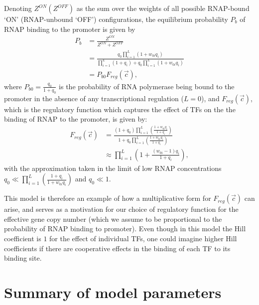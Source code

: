 \documentclass[10pt]{article}
\begin{document}
Denoting $Z^{ON} (Z^{OFF})$ as the sum over the weights of all possible RNAP-bound `ON' (RNAP-unbound `OFF') configurations, the equilibrium probability $P_b$ of RNAP binding to the promoter is given by
\begin{equation}
\begin{split}
    P_b &= \frac{Z^{ON}}{Z^{ON}+Z^{OFF}} \\
    &= \frac{q_0 \prod_{i=1}^L (1+w_{0i}q_i)}{\prod_{i=1}^L (1+q_i) + q_0 \prod_{i=1}^L (1+w_{0i}q_i)} \\
    &= P_{b0} F_{reg}(\vec{c}) ,
\end{split}
\end{equation}
where $P_{b0} = \frac{q_0}{1+q_0}$ is the probability of RNA polymerase being bound to the promoter in the absence of any transcriptional regulation ($L=0$), and $F_{reg}(\vec{c})$, which is the regulatory function which captures the effect of TFs on the the binding of RNAP to the promoter, is given by:
\begin{equation}
\begin{split}
    F_{reg}(\vec{c}) &= \frac{(1+q_0) \prod_{i=1}^L \left(\frac{1+w_{0i}q_i}{1+q_i} \right)}{1+q_0 \prod_{i=1}^L \left(\frac{1+w_{0i}q_i}{1+q_i} \right)} \\
    &\approx \prod_{i=1}^L \left(1+\frac{(w_{0i}-1)q_i}{1+q_i} \right),
\end{split}
\end{equation}
with the approximation taken in the limit of low RNAP concentrations $q_0 \ll \prod_{i=1}^L \left(\frac{1+q_i}{1+w_{0i}q_i} \right)$ and $q_0 \ll 1$.

This model is therefore an example of how a multiplicative form for $F_{reg}(\vec{c})$ can arise, and serves as a motivation for our choice of regulatory function for the effective gene copy number (which we assume to be proportional to the probability of RNAP binding to promoter). Even though in this model the Hill coefficient is $1$ for the effect of individual TFs, one could imagine higher Hill coefficients if there are cooperative effects in the binding of each TF to its binding site.

\section{Summary of model parameters}
\label{sec:ParameterList}
\end{document}
